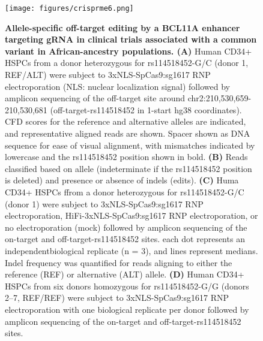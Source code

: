 \documentclass[a4paper, titlepage, openright]{book}
\begin{document}
\begin{figure}
	\centering
	\texttt{[image: figures/crisprme6.png]}
	\caption[Allele-specific off-target editing by a BCL11A enhancer targeting gRNA in clinical trials associated with a common variant in African-ancestry populations]{\textbf{Allele-specific off-target editing by a BCL11A enhancer targeting gRNA in clinical trials associated with a common variant in African-ancestry populations. (A)} Human CD34+ HSPCs from a donor heterozygous for rs114518452-G/C (donor 1, REF/ALT) were subject to 3xNLS-SpCas9:sg1617 RNP electroporation (NLS: nuclear localization signal) followed by amplicon sequencing of the off-target site around chr2:210,530,659-210,530,681 (off-target-rs114518452 in 1-start hg38 coordinates). CFD scores for the reference and alternative alleles are indicated, and representative aligned reads are shown. Spacer shown as DNA sequence for ease of visual alignment, with mismatches indicated by lowercase and the rs114518452 position shown in bold.  \textbf{(B)} Reads classified based on allele (indeterminate if the rs114518452 position is deleted) and presence or absence of indels (edits). \textbf{(C)} Huma CD34+ HSPCs ffrom a donor heterozygous for rs114518452-G/C (donor 1) were subject to 3xNLS-SpCas9:sg1617 RNP electroporation,  HiFi-3xNLS-SpCas9:sg1617 RNP electroporation, or no electroporation (mock) followed by amplicon sequencing of the on-target and off-target-rs114518452 sites. each dot represents an independentbiological replicate (n = 3), and lines represent medians. Indel frequency was quantified for reads aligning to either the reference (REF) or alternative (ALT) allele. \textbf{(D)} Human CD34+ HSPCs from six donors homozygous for rs114518452-G/G (donors 2–7, REF/REF) were subject to 3xNLS-SpCas9:sg1617 RNP electroporation with one biological replicate per donor followed by amplicon sequencing of the on-target and off-target-rs114518452 sites.}
	\label{fig:crisprme6}
\end{figure}
\end{document}
